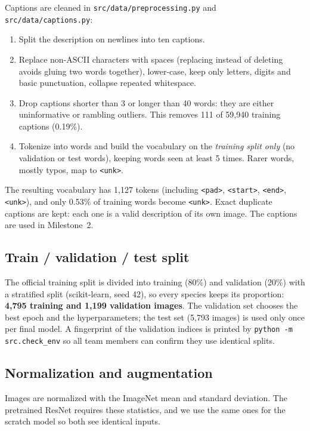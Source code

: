 \documentclass[11pt,a4paper]{article}
\begin{document}
Captions are cleaned in \texttt{src/data/preprocessing.py} and
\texttt{src/data/captions.py}:
\begin{enumerate}
  \item Split the description on newlines into ten captions.
  \item Replace non-ASCII characters with spaces (replacing instead of deleting
        avoids gluing two words together), lower-case, keep only letters,
        digits and basic punctuation, collapse repeated whitespace.
  \item Drop captions shorter than 3 or longer than 40 words: they are either
        uninformative or rambling outliers. This removes 111 of 59,940
        training captions (0.19\%).
  \item Tokenize into words and build the vocabulary on the \emph{training
        split only} (no validation or test words), keeping words seen at least
        5 times. Rarer words, mostly typos, map to \texttt{<unk>}.
\end{enumerate}
The resulting vocabulary has 1,127 tokens (including \texttt{<pad>},
\texttt{<start>}, \texttt{<end>}, \texttt{<unk>}), and only 0.53\% of training
words become \texttt{<unk>}. Exact duplicate captions are kept: each one is a
valid description of its own image. The captions are used in Milestone~2.

\subsection{Train / validation / test split}

The official training split is divided into training (80\%) and validation
(20\%) with a stratified split (scikit-learn, seed 42), so every species keeps
its proportion: \textbf{4,795 training and 1,199 validation images}. The
validation set chooses the best epoch and the hyperparameters; the test set
(5,793 images) is used only once per final model. A fingerprint of the
validation indices is printed by \texttt{python -m src.check\_env} so all team
members can confirm they use identical splits.

\subsection{Normalization and augmentation}

Images are normalized with the ImageNet mean and standard deviation. The
pretrained ResNet requires these statistics, and we use the same ones for the
scratch model so both see identical inputs.
\end{document}
